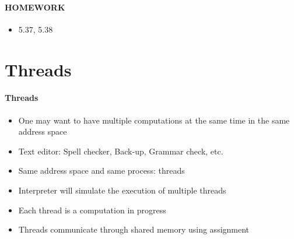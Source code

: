 \documentclass{beamer}
\begin{document}
\begin{frame}[fragile]
\framesubtitle{HOMEWORK}
\begin{scriptsize}
\begin{itemize}
\item<1-> 5.37, 5.38

\end{itemize}
\end{scriptsize}
\end{frame}


\section{Threads}

\begin{frame}[fragile]
\framesubtitle{Threads}
\begin{scriptsize}
\begin{itemize}
\item<1-> One may want to have multiple computations at the same time in the same address space

\item<1-> Text editor: Spell checker, Back-up, Grammar check, etc.

\item<1-> Same address space and same process: threads

\item<2-> Interpreter will simulate the execution of multiple threads

\item<2-> Each thread is a computation in progress

\item<2-> Threads communicate through shared memory using assignment

\end{itemize}
\end{scriptsize}
\end{frame}
\end{document}
